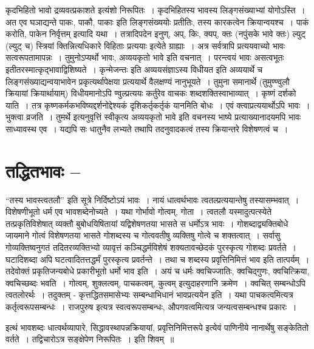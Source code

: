 {कृदभिहितो भावो द्रव्यवत्प्रकाशते इत्यंशो निरूपितः~। कृदभिहितस्य भावस्य लिङ्गसंख्याभ्यां योगोऽस्ति~। अत एव घञाद्यन्ते पाकः, पाकौ, पाकाः इति लिङ्गसंख्ययोः प्रतीतिः, तस्य कारकत्वेन क्रियान्वयश्च~। पाकं करोति, पाकेन निर्वृत्तम् इत्यादि यथा~। तत्रादिपदेन इनुण्, अप्, किः, क्यप्, क्तः (नपुंसके भावे क्तः) ल्युट् (ल्युट् च) स्त्रियां क्तिन्नित्यधिकारे विहिताः प्रत्ययाः इत्येते ग्राह्याः~। अत्र सर्वत्रापि प्रत्ययवाच्यो भावः सत्वरूपतामापन्नः~। तुमुनोऽप्यर्थो भावः, अव्ययकृतो भावे इति वचनात्~। परन्त्वयं भावः असत्वभूतः इतीतरस्मात्कृद्भावाद्विशिष्यते~। कृन्मेजन्तः इति अव्ययसंज्ञाऽस्य विधीयत इति अव्ययार्थे च लिङ्गसंख्याद्यन्वयाभावेन प्रकृत्यर्थापेक्षया प्रत्ययार्थे वैलक्षण्यं नानुभूयते~। तुमुना समानार्थे (तुमुण्ण्वुलौ क्रियायां क्रियार्थायाम्) विधीयमानोऽपि ण्वुल्प्रत्ययः कर्तुरेव वाचकः शब्दशक्तिस्वाभाव्यात्~। कृष्णं दर्शको याति~। तत्र कृष्णकर्मकभविष्यद्दर्शनोद्देश्यकं दृशिकर्तृकर्तृकं यानमिति बोधः~। एवं क्त्वाप्रत्ययार्थोऽपि भावः~। भुक्त्वा व्रजति~। तुमर्थे इत्यनुवृत्तिं स्वीकृत्य अव्ययकृतो भावे इति वचनस्य भाष्ये प्रत्याख्यानादयमपि भावः साध्यावस्थ एव~। यद्यपि सः धातुनैव लभ्यते तथापि तदनुवादकत्वं तस्य क्रियान्तरे विशेषणत्वं च~। 

\section*{तद्धितभावः –}

“तस्य भावस्त्वतलौ” इति सूत्रे निर्दिष्टोऽयं भावः~। नायं धात्वर्थभावः त्वतल्प्रत्ययान्तेषु तस्यासम्भवात्~। विशेषणीभूतो धर्म एव भावशब्देनोच्यते~। यथा गोर्भावो गोत्वम्, गोता~। त्वतलौ यस्मादुत्पत्स्येते तत्प्रकृतिविशेषात् व्यक्तौ बुबोधयिषितायां यद्विशेषणतया भासते स धर्मोऽत्र भावः~। गोशब्दाद्व्यक्तिबोधे जायमाने गोत्वं विशेषणतया भासते गोशब्दस्य च गोत्ववतीषु व्यक्तिषु गोत्वे च शक्तत्वात्~। सर्वासु गोव्यक्तिष्वनुगतं तदितरव्यक्तिभ्यो व्यावृत्तं कञ्चिद्धर्मविशेषं शक्यतावच्छेदकं पुरस्कृत्य गोशब्दः प्रवर्तते~। घटादिशब्दा अपि घटत्वादितत्तद्धर्मं पुरस्कृत्य प्रवर्तन्ते~। तथा च शब्दस्य प्रवृत्तिनिमित्तं भाव इति तात्पर्यम्~। तदेवोक्तं प्रकृतिजन्यबोधे प्रकारीभूतो धर्मो भाव इति~। अयं च धर्मः क्वचिज्जातिः, क्वचिद्गुणः, क्वचित्क्रिया, क्वचिच्छब्दः भवति~। गोत्वम्, शुक्लत्वम्, पाचकत्वम्, कुत्वम् इत्युदाहरणानि क्रमेण~। क्वचित् सम्बन्धोऽपि त्वतलोरर्थः~। तदुक्तम् - कृत्तद्धितसमासेभ्यः सम्बन्धाभिधानं भावप्रत्ययेन इति~। यथा पाचकत्वमित्यत्र कर्तृत्वरूपसम्बन्धः~। राजपुरुष इत्यत्र स्वत्वरूपसम्बन्धः, औपगवत्वमित्यत्र जन्यत्वसम्बन्धश्च प्रकारः~। 

इत्थं भावशब्दः धात्वर्थव्यापारे, सिद्धावस्थापन्नक्रियायां, प्रवृत्तिनिमित्तरूपे इत्येवं पाणिनीये नानार्थेषु सङ्केतितो वर्तते~। तद्विचारोऽत्र सङ्क्षेपेण निरूपितः~। इति शिवम्~॥

\articleend
}
